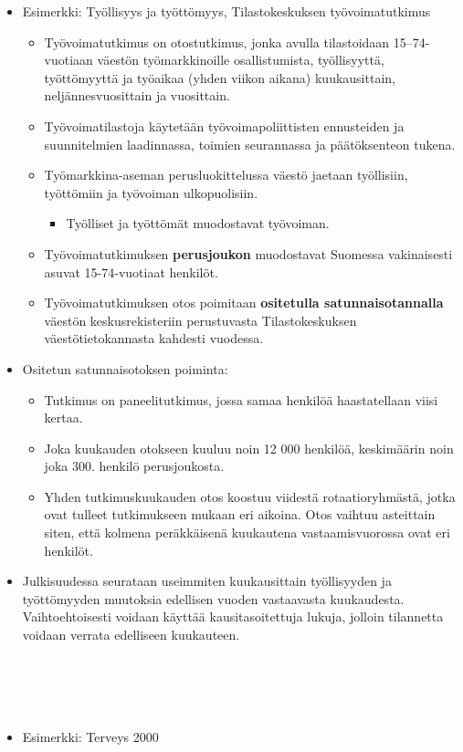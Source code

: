 \documentclass[
]{book}
\providecommand{\tightlist}{%
  \setlength{\itemsep}{0pt}\setlength{\parskip}{0pt}}
\begin{document}
\begin{itemize}
\item
  Esimerkki: Työllisyys ja työttömyys, Tilastokeskuksen työvoimatutkimus

  \begin{itemize}
  \tightlist
  \item
    Työvoimatutkimus on otostutkimus, jonka avulla tilastoidaan 15--74-vuotiaan väestön työmarkkinoille osallistumista, työllisyyttä, työttömyyttä ja työaikaa (yhden viikon aikana) kuukausittain, neljännesvuosittain ja vuosittain.
  \item
    Työvoimatilastoja käytetään työvoimapoliittisten ennusteiden ja suunnitelmien laadinnassa, toimien seurannassa ja
    päätöksenteon tukena.
  \item
    Työmarkkina-aseman perusluokittelussa väestö jaetaan työllisiin, työttömiin ja työvoiman ulkopuolisiin.

    \begin{itemize}
    \tightlist
    \item
      Työlliset ja työttömät muodostavat työvoiman.
    \end{itemize}
  \item
    Työvoimatutkimuksen \textbf{perusjoukon} muodostavat Suomessa vakinaisesti asuvat 15-74-vuotiaat henkilöt.
  \item
    Työvoimatutkimuksen otos poimitaan \textbf{ositetulla satunnaisotannalla} väestön keskusrekisteriin perustuvasta Tilastokeskuksen väestötietokannasta kahdesti vuodessa.
  \end{itemize}
\item
  Ositetun satunnaisotoksen poiminta:

  \begin{itemize}
  \tightlist
  \item
    Tutkimus on paneelitutkimus, jossa samaa henkilöä haastatellaan viisi kertaa.
  \item
    Joka kuukauden otokseen kuuluu noin 12 000 henkilöä, keskimäärin noin joka 300. henkilö perusjoukosta.
  \item
    Yhden tutkimuskuukauden otos koostuu viidestä rotaatioryhmästä, jotka ovat tulleet tutkimukseen mukaan eri aikoina. Otos vaihtuu asteittain siten, että kolmena peräkkäisenä kuukautena vastaamisvuorossa ovat eri henkilöt.
  \end{itemize}
\item
  Julkisuudessa seurataan useimmiten kuukausittain työllisyyden ja työttömyyden muutoksia edellisen vuoden vastaavasta kuukaudesta. Vaihtoehtoisesti voidaan käyttää kausitasoitettuja lukuja, jolloin tilannetta voidaan verrata edelliseen kuukauteen.\\
  ~\\
  ~\\
  ~\\
  ~\\
\item
  Esimerkki: Terveys 2000


\end{itemize}
\end{document}
